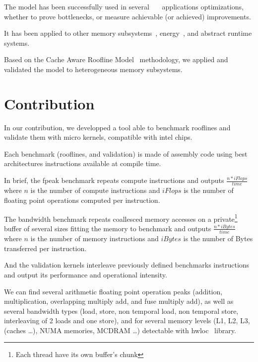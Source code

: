 \documentclass[twoside,twocolumn,8pt]{extarticle}
\begin{document}
The model has been successfully used in
several~\cite{Kim20111201}~\cite{Rossinelli2164}~\cite{vanNieuwpoort:2009:UMH:1542275.1542337} applications optimizations, whether
to prove bottlenecks, or measure achievable (or achieved) improvements.

It has been applied to other memory subsystems~\cite{ilic2014cache}, energy~\cite{7493653}, and abstract runtime systems.

Based on the Cache Aware Roofline Model~\cite{ilic2014cache} methodology, we applied and validated the model to heterogeneous
memory subsystems.

\section{Contribution}\label{sec:contrib}
In our contribution, we developped a tool able to benchmark rooflines and validate them with micro kernels, compatible with intel
chips.

Each benchmark (rooflines, and validation) is made of assembly code using best architectures instructions available at compile
time.

In brief, the fpeak benchmark repeats compute instructions and outputs $\frac{n*iFlops}{time}$ where $n$ is the number of compute
instructions and $iFlops$ is the number of floating point operations computed per instruction.

The bandwidth benchmark repeats coallesced memory accesses on a private\footnote{Each thread have its own buffer's chunk} buffer of several sizes fitting the memory to benchmark and outputs $\frac{n*iBytes}{time}$ where $n$ is the number of memory instructions and $iBytes$ is the number of Bytes transferred per instruction.

And the validation kernels interleave previously defined benchmarks instructions and output its performance and operational intensity.

We can find several arithmetic floating point operation peaks (addition, multiplication, overlapping multiply add, and fuse
multiply add), as well as several bandwidth types (load, store, non temporal load, non temporal store, interleaving of 2 loads and one store), and for several memory levels (L1, L2, L3, (caches \dots), NUMA memories, MCDRAM \dots) detectable with hwloc~\cite{6903671} library.
\end{document}
